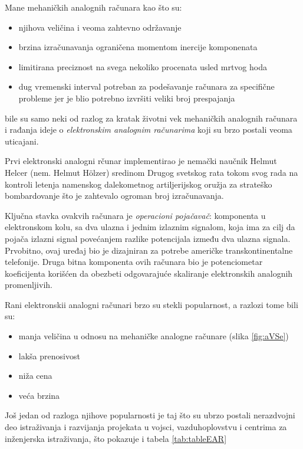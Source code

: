 \documentclass[a4paper]{article}
\begin{document}
{		\bigskip
		
		\par Mane mehaničkih analognih računara kao što su:
		\begin{itemize}
			\item njihova veličina i veoma zahtevno održavanje
			\item brzina izračunavanja ograničena momentom inercije komponenata
			\item limitirana preciznost na svega nekoliko procenata usled mrtvog hoda
			\item dug vremenski interval potreban za podešavanje računara za specifične probleme jer je blio potrebno izvršiti veliki broj prespajanja
		\end{itemize}
		bile su samo neki od razlog za kratak životni vek mehaničkih analognih računara i rađanja ideje o \emph{elektronskim analognim računarima} koji su brzo postali veoma uticajani.
		
		\bigskip
		
		\par Prvi elektronski analogni rčunar implementirao je nemački naučnik Helmut Helcer (nem. Helmut Hölzer) sredinom Drugog svetskog rata tokom svog rada na kontroli letenja namenskog dalekometnog artiljerijskog oružja za strateško bombardovanje što je zahtevalo ogroman broj izračunavanja. \cite{Holzer}
		
		\bigskip
		
		\par Ključna stavka ovakvih računara je \emph{operacioni pojačavač}: komponenta u elektronskom kolu, sa dva ulazna i jednim izlaznim signalom, koja ima za cilj da pojača izlazni signal povećanjem razlike potencijala između dva ulazna signala. Prvobitno, ovaj uređaj bio je dizajniran za potrebe američke transkontinentalne telefonije. Druga bitna komponenta ovih računara bio je potenciometar koeficijenta korišćen da obezbeti odgovarajuće skaliranje elektronskih analognih promenljivih.
		
		\bigskip
		
		\par Rani elektronskii analogni računari brzo su stekli popularnost, a razlozi tome bili su:
		\begin{itemize}
			\item manja veličina u odnosu na mehaničke analogne računare (slika \ref{fig:aVSe})
			\item lakša prenosivost
			\item niža cena
			\item  veća brzina
		\end{itemize}
		Još jedan od razloga njihove popularnosti je taj što su ubrzo postali nerazdvojni deo istraživanja i razvijanja projekata u vojsci, vazduhoplovstvu i centrima za inženjerska istraživanja, što pokazuje i tabela \ref{tab:tableEAR} \cite{table}
		
}
\end{document}
